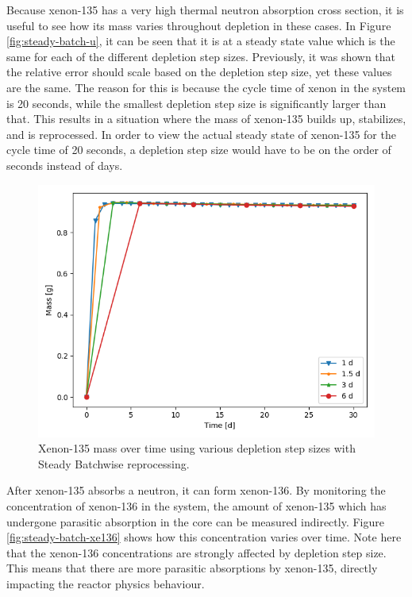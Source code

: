 Because xenon-135 has a very high thermal neutron absorption cross section, it is useful to see how its mass varies throughout depletion in these cases.
In Figure \ref{fig:steady-batch-u}, it can be seen that it is at a steady state value which is the same for each of the different depletion step sizes.
Previously, it was shown that the relative error should scale based on the depletion step size, yet these values are the same. The reason for this is because the cycle time of xenon in the system is 20 seconds, while the smallest depletion step size is significantly larger than that. This results in a situation where the mass of xenon-135 builds up, stabilizes, and is reprocessed. In order to view the actual steady state of xenon-135 for the cycle time of 20 seconds, a depletion step size would have to be on the order of seconds instead of days.

\begin{figure}[H]
  \centering
  \includegraphics[scale=0.7]{images/Xe135_sp_comp.png}
  \caption{Xenon-135 mass over time using various depletion step sizes with Steady Batchwise reprocessing.}
   \label{fig:steady-batch-xe135}
\end{figure}

After xenon-135 absorbs a neutron, it can form xenon-136.
By monitoring the concentration of xenon-136 in the system, the amount of xenon-135 which has undergone parasitic absorption in the core can be measured indirectly.
Figure \ref{fig:steady-batch-xe136} shows how this concentration varies over time.
Note here that the xenon-136 concentrations are strongly affected by depletion step size.
This means that there are more parasitic absorptions by xenon-135, directly impacting the reactor physics behaviour.

